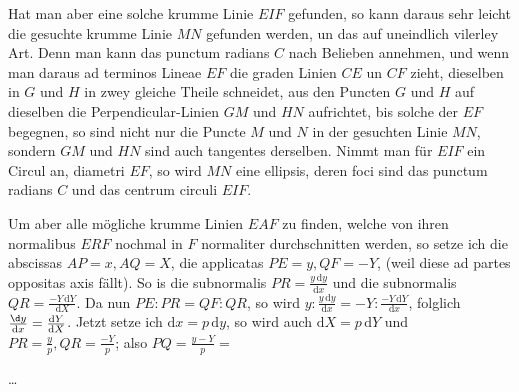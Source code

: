 \documentclass[10pt,a4paper]{article}
\def\D{\mathrm{d}}
\begin{document}
\begin{paracol}{2}
	\par Hat man aber eine solche krumme Linie $EIF$ gefunden, so kann daraus sehr leicht die gesuchte krumme Linie $MN$ gefunden werden, un das auf uneindlich vilerley Art. Denn man kann das punctum radians $C$ nach Belieben annehmen, und wenn man daraus ad terminos Lineae $EF$ die graden Linien $CE$ un $CF$ zieht, dieselben in $G$ und $H$ in zwey gleiche Theile schneidet, aus den Puncten $G$ und $H$ auf dieselben die Perpendicular-Linien $GM$ und $HN$ aufrichtet, bis solche der $EF$ begegnen, so sind nicht nur die Puncte $M$ und $N$ in der gesuchten Linie $MN$, sondern $GM$ und $HN$ sind auch tangentes derselben. Nimmt man für $EIF$ ein Circul an, diametri $EF$, so wird $MN$ eine ellipsis, deren foci sind das punctum radians $C$ und das centrum circuli $EIF$.
	
	\par Um aber alle mögliche krumme Linien $EAF$ zu finden, welche von ihren normalibus $ERF$ nochmal in $F$ normaliter durchschnitten werden, so setze ich die abscissas $AP=x, AQ=X$, die applicatas $PE=y, QF=-Y$, (weil diese ad partes oppositas axis fällt). So is die subnormalis $PR=\frac{y\, \D y}{\D x}$ und die subnormalis $QR=\frac{-Y\, \D Y}{\D X}$. Da nun $PE:PR = QF:QR$, so wird $y:\frac{y\, \D y}{\D x} = -Y:\frac{-Y\, \D Y}{\D x}$, folglich $\frac{\d y}{\D x} = \frac{\D Y}{\D X}$. Jetzt setze ich $\D x = p\, \D y$, so wird auch $\D X = p\, \D Y$ und $PR=\frac{y}{p}, QR=\frac{-Y}{p}$; also $PQ=\frac{y-Y}{p}=$
	
	\switchcolumn
	\par \ldots
	\par 
	
	\switchcolumn*
\end{paracol}
\end{document}
